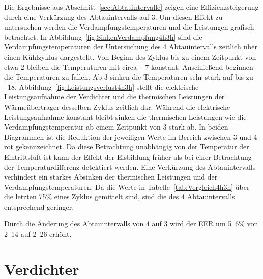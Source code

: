 Die Ergebnisse aus Abschnitt~\ref{sec:Abtauintervalle} zeigen eine Effizienzsteigerung durch eine Verkürzung des Abtauintervalls auf \unit{3}{\hour}. Um diesen Effekt zu untersuchen werden die Verdampfungstemperaturen und die Leistungen grafisch betrachtet.
In Abbildung~\ref{fig:SinkenVerdampfung4h3h} sind die Verdampfungstemperaturen der Untersuchung des \unit{4}{\hour} Abtauintervalls zeitlich über einen Kühlzyklus dargestellt. Von Beginn des Zyklus bis zu einem Zeitpunkt von etwa \unit{2}{\hour} bleiben die Temperaturen mit circa \unit{-7}{\celsius} konstant. Anschließend beginnen die Temperaturen zu fallen. Ab \unit{3}{\hour} sinken die Temperaturen sehr stark auf bis zu \unit{-18}{\celsius}.
Abbildung~\ref{fig:Leistungsverlust4h3h} stellt die elektrische Leistungsaufnahme der Verdichter und die thermischen Leistungen der Wärmeübertrager desselben Zyklus zeitlich dar. Während die elektrische Leistungsaufnahme konstant bleibt sinken die thermischen Leistungen wie die Verdampfungstemperatur ab einem Zeitpunkt von \unit{3}{\hour} stark ab. In beiden Diagrammen ist die Reduktion der jeweiligen Werte im Bereich zwischen \unit{3}{\hour} und \unit{4}{\hour} rot gekennzeichnet. \newline
Da diese Betrachtung unabhängig von der Temperatur der Eintrittsluft ist kann der Effekt der Eisbildung früher als bei einer Betrachtung der Temperaturdifferenz detektiert werden. Eine Verkürzung des Abtauintervalls verhindert ein starkes Absinken der thermischen Leistungen und der Verdampfungstemperaturen. Da die Werte in Tabelle~\ref{tab:Vergleich4h3h} über die letzten \unit{75}{\%} eines Zyklus gemittelt sind, sind die des \unit{4}{\hour} Abtauintervalls entsprechend geringer.

Durch die Änderung des Abtauintervalls von \unit{4}{\hour} auf \unit{3}{\hour} wird der EER um \unit{5.6}{\%} von \unit{2.14}{} auf \unit{2.26}{} erhöht.















\section{Verdichter}
\label{sec:VerdichterAnalyse}

